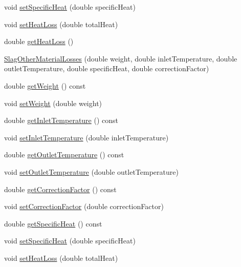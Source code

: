 \begin{DoxyCompactItemize}
void \hyperlink{class_slag_other_material_losses_a05488997f264a74afe3229250a286f92}{set\+Specific\+Heat} (double specific\+Heat)
\item 
void \hyperlink{class_slag_other_material_losses_a33d59aed5492ec2912615e93b6ff273e}{set\+Heat\+Loss} (double total\+Heat)
\item 
double \hyperlink{class_slag_other_material_losses_a4c96a826ef6da38f4c27f7efd8b4a7ba}{get\+Heat\+Loss} ()
\item 
\hyperlink{class_slag_other_material_losses_a8b09bf5dd916a6c7df45b5bf2849e6b8}{Slag\+Other\+Material\+Losses} (double weight, double inlet\+Temperature, double outlet\+Temperature, double specific\+Heat, double correction\+Factor)
\item 
double \hyperlink{class_slag_other_material_losses_a9b62b86eb4ec919d70dd8899ef5d3513}{get\+Weight} () const
\item 
void \hyperlink{class_slag_other_material_losses_a230a178f2ead59cd498b620e4bb4910f}{set\+Weight} (double weight)
\item 
double \hyperlink{class_slag_other_material_losses_aebd0f1b7d6c4bf0deb8ce8a86c5a80a7}{get\+Inlet\+Temperature} () const
\item 
void \hyperlink{class_slag_other_material_losses_a47bb0a61de501e3e9b7bd2bf2651eb8c}{set\+Inlet\+Temperature} (double inlet\+Temperature)
\item 
double \hyperlink{class_slag_other_material_losses_a1c48f1a70aaf030451b7e350f3d6cd18}{get\+Outlet\+Temperature} () const
\item 
void \hyperlink{class_slag_other_material_losses_afae6aafff94d02926135fabf20a87070}{set\+Outlet\+Temperature} (double outlet\+Temperature)
\item 
double \hyperlink{class_slag_other_material_losses_a920bbc2da2ba90416e86573830eee2cb}{get\+Correction\+Factor} () const
\item 
void \hyperlink{class_slag_other_material_losses_a2aa985511888327bed6039da79c8958a}{set\+Correction\+Factor} (double correction\+Factor)
\item 
double \hyperlink{class_slag_other_material_losses_aa68e92bdf836a4112c55344f897f2649}{get\+Specific\+Heat} () const
\item 
void \hyperlink{class_slag_other_material_losses_a05488997f264a74afe3229250a286f92}{set\+Specific\+Heat} (double specific\+Heat)
\item 
void \hyperlink{class_slag_other_material_losses_a33d59aed5492ec2912615e93b6ff273e}{set\+Heat\+Loss} (double total\+Heat)

\end{DoxyCompactItemize}
